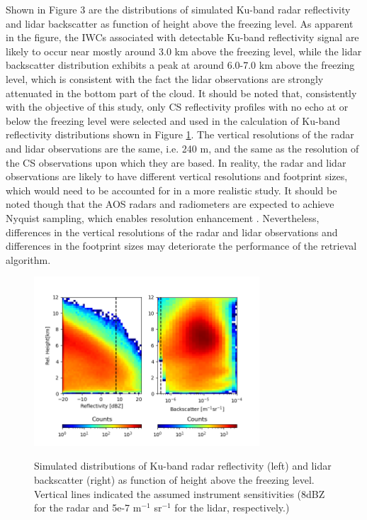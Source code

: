 \documentclass{ametsocV6.1}
\begin{document}
Shown in Figure 3 are the distributions of simulated Ku-band radar reflectivity and 
lidar backscatter as function of height above the freezing level.
As apparent in the figure, the IWCs associated with detectable Ku-band reflectivity
signal are likely to
occur near mostly around 3.0 km above the freezing level, while the lidar backscatter
distribution exhibits a peak at around 6.0-7.0 km
above the freezing level, which is consistent with the fact the lidar observations
are strongly attenuated in the bottom part of the cloud.  It should be noted that, consistently with the objective of
 this study, only CS reflectivity profiles with no echo at or below the freezing level were selected
and used in the calculation of Ku-band reflectivity distributions shown in Figure \ref{f3}.
The vertical resolutions of
the radar and lidar observations are the same, i.e. 240 m, and the same as the resolution of the
CS observations upon which they are based. In reality, the radar and lidar observations are likely to have
different vertical resolutions and footprint sizes, which would need to be accounted for in a more 
realistic study.  It should be noted though that the AOS radars and radiometers are expected to achieve
Nyquist sampling, which enables resolution enhancement \citep{early2001image}.  Nevertheless, differences
in the vertical resolutions of the radar and lidar observations and differences in the footprint sizes
may deteriorate the performance of the retrieval algorithm.

\begin{figure}[t]
    \centering
    \includegraphics[width=0.75\textwidth,angle=0]{./Figs/fig03.rev.png}\\
    \caption{Simulated distributions of Ku-band radar reflectivity (left) and lidar backscatter (right)
    as function of height above 
    the freezing level. Vertical lines indicated the assumed instrument sensitivities (8dBZ for the 
    radar and 5e-7 m$^{-1}$ sr$^{-1}$ for the lidar, respectively.) }\label{f3}
\end{figure}
\end{document}
